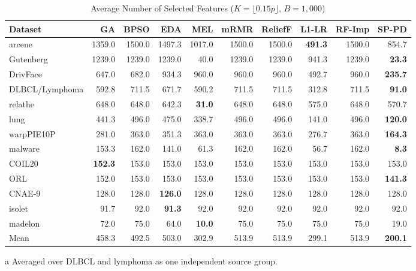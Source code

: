 \begin{table}[!b]
\centering
\begin{threeparttable}
\caption{Average Number of Selected Features ($K = \lfloor 0.15p \rfloor$, $B = 1{,}000$)}
\label{tab:app_highdim_feat}
\scriptsize
\setlength{\tabcolsep}{7.2pt}
\renewcommand{\arraystretch}{1.06}
\begin{tabular}{@{}lrrrrrrrrr@{}}
\toprule
Dataset & GA & BPSO & EDA & MEL & mRMR & ReliefF & L1-LR & RF-Imp & SP-PD \\
\midrule
arcene                  & 1359.0 & 1500.0 & 1497.3 & 1017.0 & 1500.0 & 1500.0 & \textbf{491.3} & 1500.0 & 854.7 \\
Gutenberg               & 1239.0 & 1239.0 & 1239.0 &   40.0 & 1239.0 & 1239.0 & 941.3 & 1239.0 & \textbf{23.3} \\
DrivFace                &  647.0 &  682.0 &  934.3 &  960.0 &  960.0 &  960.0 & 492.7 &  960.0 & \textbf{235.7} \\
DLBCL/Lymphoma\tnote{a} &  592.8 &  711.5 &  671.7 &  590.2 &  711.5 &  711.5 & 312.8 &  711.5 & \textbf{91.0} \\
relathe                 &  648.0 &  648.0 &  642.3 &  \textbf{31.0} &  648.0 &  648.0 & 575.0 &  648.0 & 570.7 \\
lung                    &  441.3 &  496.0 &  475.0 &  338.7 &  496.0 &  496.0 & 141.0 &  496.0 & \textbf{120.0} \\
warpPIE10P              &  281.0 &  363.0 &  351.3 &  363.0 &  363.0 &  363.0 & 276.7 &  363.0 & \textbf{164.3} \\
malware                 &  153.3 &  162.0 &  141.0 &   61.3 &  162.0 &  162.0 &  56.7 &  162.0 & \textbf{8.3} \\
COIL20                  &  \textbf{152.3} &  153.0 &  153.0 &  153.0 &  153.0 &  153.0 & 153.0 &  153.0 & 153.0 \\
ORL                     &  152.0 &  153.0 &  153.0 &  153.0 &  153.0 &  153.0 & 153.0 &  153.0 & \textbf{141.3} \\
CNAE-9                  &  128.0 &  128.0 &  \textbf{126.0} &  128.0 &  128.0 &  128.0 & 128.0 &  128.0 & 128.0 \\
isolet                  &   91.7 &   92.0 &   \textbf{91.3} &   92.0 &   92.0 &   92.0 &  92.0 &   92.0 &  92.0 \\
madelon                 &   72.0 &   75.0 &   64.0 &   \textbf{10.0} &   75.0 &   75.0 &  75.0 &   75.0 &  19.0 \\
\midrule
Mean                      &  458.3 &  492.5 &  503.0 &  302.9 &  513.9 &  513.9 & 299.1 &  513.9 & \textbf{200.1} \\
\bottomrule
\end{tabular}
\begin{tablenotes}[flushleft]
\scriptsize
\item[a] Averaged over DLBCL and lymphoma as one independent source group.
\end{tablenotes}
\end{threeparttable}
\end{table}

